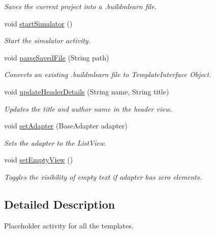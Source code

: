 \begin{DoxyCompactItemize}
\begin{DoxyCompactList}\small\item\em Saves the current project into a .buildmlearn file. \end{DoxyCompactList}\item 
void \hyperlink{classorg_1_1buildmlearn_1_1toolkit_1_1activity_1_1TemplateEditor_a0f4842fdb6b28f218c6f2ac5c69e62e1}{start\-Simulator} ()
\begin{DoxyCompactList}\small\item\em Start the simulator activity. \end{DoxyCompactList}\item 
void \hyperlink{classorg_1_1buildmlearn_1_1toolkit_1_1activity_1_1TemplateEditor_aef3001b6ab6df927e92ada78c02bc7da}{parse\-Saved\-File} (String path)
\begin{DoxyCompactList}\small\item\em Converts an existing .buildmlearn file to Template\-Interface Object. \end{DoxyCompactList}\item 
void \hyperlink{classorg_1_1buildmlearn_1_1toolkit_1_1activity_1_1TemplateEditor_a3d785b7595c43249fc5a73e4f69daf41}{update\-Header\-Details} (String name, String title)
\begin{DoxyCompactList}\small\item\em Updates the title and author name in the header view. \end{DoxyCompactList}\item 
void \hyperlink{classorg_1_1buildmlearn_1_1toolkit_1_1activity_1_1TemplateEditor_a5c1e35aa985ed2199d9795ad1ab03e0d}{set\-Adapter} (Base\-Adapter adapter)
\begin{DoxyCompactList}\small\item\em Sets the adapter to the List\-View. \end{DoxyCompactList}\item 
void \hyperlink{classorg_1_1buildmlearn_1_1toolkit_1_1activity_1_1TemplateEditor_afd3a9fb9738a176e2043f19a25cd7936}{set\-Empty\-View} ()
\begin{DoxyCompactList}\small\item\em Toggles the visibility of empty text if adapter has zero elements. \end{DoxyCompactList}\end{DoxyCompactItemize}


\subsection{Detailed Description}
Placeholder activity for all the templates. 

